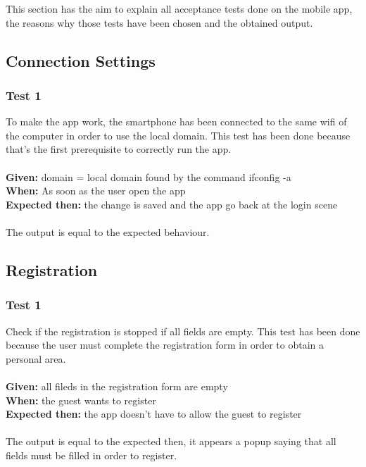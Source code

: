 This section has the aim to explain all acceptance tests done on the mobile app, the reasons why those tests have been chosen and the obtained output.
\subsection{Connection Settings}

\subsubsection{\Large{Test 1}}
To make the app work, the smartphone has been connected to the same wifi of the computer in order to use the local domain. This test has been done because that's the first prerequisite to correctly run the app.\\
\\
\textbf{Given: } domain = local domain found by the command ifconfig -a \\
\textbf{When: } As soon as the user open the app\\
\textbf{Expected then: } the change is saved and  the app go back at the login scene\\
\\
The output is equal to the expected behaviour.

\subsection{Registration}

\subsubsection{\Large{Test 1}}
Check if the registration is stopped if all fields are empty. This test has been done because the user must complete the registration form in order to obtain a personal area.\\
\\
\textbf{Given: } all fileds in the registration form are empty\\
\textbf{When: } the guest wants to register\\
\textbf{Expected then: } the app doesn't have to allow the guest to register\\
\\
The output is equal to the expected then, it appears a popup saying that all fields must be filled in order to register.

